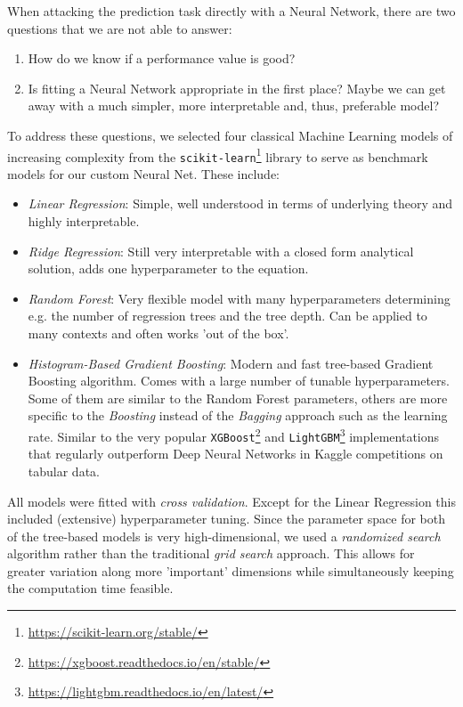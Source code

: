 When attacking the prediction task directly with a Neural Network, there are two questions that we are not able to answer:
\begin{enumerate}
  \item How do we know if a performance value is good?
  \item Is fitting a Neural Network appropriate in the first place?
        Maybe we can get away with a much simpler, more interpretable and, thus, preferable model?
\end{enumerate}
To address these questions, we selected four classical Machine Learning models of increasing complexity from the \texttt{scikit-learn}\footnote{\url{https://scikit-learn.org/stable/}} library \citep{pedregosa2011} to serve as benchmark models for our custom Neural Net.
These include:
\begin{itemize}
  \item \textit{Linear Regression}:
        Simple, well understood in terms of underlying theory and highly interpretable.
  \item \textit{Ridge Regression}:
        Still very interpretable with a closed form analytical solution, adds one hyperparameter to the equation.
  \item \textit{Random Forest}:
        Very flexible model with many hyperparameters determining e.g. the number of regression trees and the tree depth.
        Can be applied to many contexts and often works 'out of the box'.
  \item \textit{Histogram-Based Gradient Boosting}:
        Modern and fast tree-based Gradient Boosting algorithm.
        Comes with a large number of tunable hyperparameters.
        Some of them are similar to the Random Forest parameters, others are more specific to the \emph{Boosting} instead of the \emph{Bagging} approach such as the learning rate.
        Similar to the very popular \texttt{XGBoost}\footnote{\url{https://xgboost.readthedocs.io/en/stable/}} \citep{chen2016} and \texttt{LightGBM}\footnote{\url{https://lightgbm.readthedocs.io/en/latest/}} \citep{ke2017} implementations that regularly outperform Deep Neural Networks in Kaggle competitions on tabular data.
\end{itemize}

All models were fitted with \emph{cross validation}.
Except for the Linear Regression this included (extensive) hyperparameter tuning.
Since the parameter space for both of the tree-based models is very high-dimensional, we used a \emph{randomized search} algorithm \citep{bergstra2012} rather than the traditional \emph{grid search} approach.
This allows for greater variation along more 'important' dimensions while simultaneously keeping the computation time feasible.


